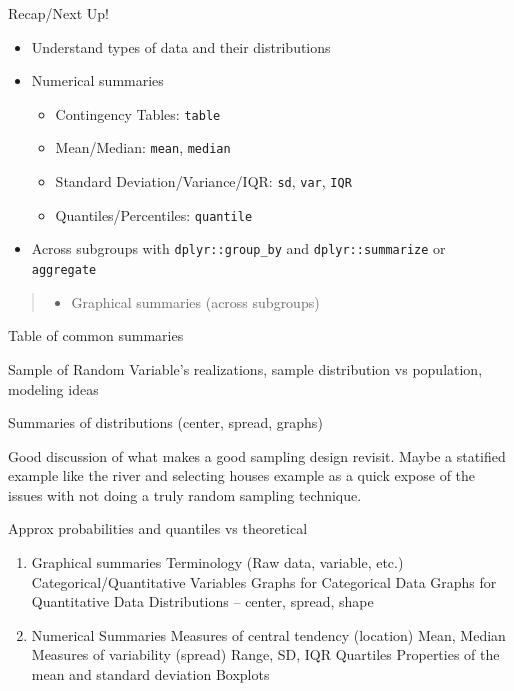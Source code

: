 \documentclass[
]{book}
\providecommand{\tightlist}{%
  \setlength{\itemsep}{0pt}\setlength{\parskip}{0pt}}
\theoremstyle{definition}
\theoremstyle{definition}
\theoremstyle{definition}
\theoremstyle{remark}
\begin{document}
Recap/Next Up!

\begin{itemize}
\item
  Understand types of data and their distributions
\item
  Numerical summaries

  \begin{itemize}
  \tightlist
  \item
    Contingency Tables: \texttt{table}\\
  \item
    Mean/Median: \texttt{mean}, \texttt{median}
  \item
    Standard Deviation/Variance/IQR: \texttt{sd}, \texttt{var}, \texttt{IQR}
  \item
    Quantiles/Percentiles: \texttt{quantile}
  \end{itemize}
\item
  Across subgroups with \texttt{dplyr::group\_by} and \texttt{dplyr::summarize} or \texttt{aggregate}
\end{itemize}

\begin{quote}
\begin{itemize}
\tightlist
\item
  Graphical summaries (across subgroups)
\end{itemize}
\end{quote}

Table of common summaries

Sample of Random Variable's realizations, sample distribution vs population, modeling ideas

Summaries of distributions (center, spread, graphs)

Good discussion of what makes a good sampling design revisit. Maybe a statified example like the river and selecting houses example as a quick expose of the issues with not doing a truly random sampling technique.

Approx probabilities and quantiles vs theoretical

\begin{enumerate}
\def\labelenumi{\arabic{enumi}.}
\setcounter{enumi}{1}
\item
  Graphical summaries
  Terminology (Raw data, variable, etc.)
  Categorical/Quantitative Variables
  Graphs for Categorical Data
  Graphs for Quantitative Data
  Distributions -- center, spread, shape
\item
  Numerical Summaries
  Measures of central tendency (location)
  Mean, Median
  Measures of variability (spread)
  Range, SD, IQR
  Quartiles
  Properties of the mean and standard deviation
  Boxplots
\end{enumerate}
\end{document}
